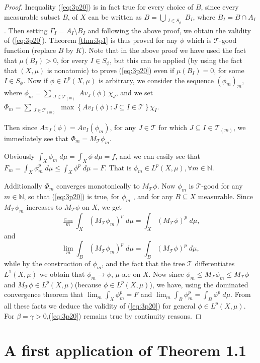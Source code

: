 \documentclass{article}
\numberwithin{equation}{section}
\theoremstyle{definition}
\theoremstyle{remark}
\newcommand{\mc}[1]{\mathcal{#1}}
\begin{document}
\begin{proof}
Inequality (\ref{eq:3p20}) is in fact true for every choice of $B$, since every measurable subset $B$, of $X$ can be written as  $B=\bigcup_{\substack{I\in S_\phi}}B_I$, where $B_I=B\cap A_I$. Then setting $\Gamma_I=A_I\setminus B_I$ and following the above proof, we obtain the validity of (\ref{eq:3p20}). Theorem \ref{thm:3p1} is thus proved for any $\phi$ which is $\mc T$-good function (replace $B$ by $K$). Note that in the above proof we have used the fact that $\mu(B_I)>0$, for every $I\in S_{\phi}$, but this can be applied (by using the fact that $(X, \mu)$ is nonatomic) to prove (\ref{eq:3p20}) even if $\mu(B_I)=0$, for some $I\in S_{\phi}$. Now if $\phi\in L^p(X,\mu)$ is arbitrary, we consider the sequence $(\phi_m)_m$, where $\phi_m=\sum_{\substack{J\in \mc T_{(m)}}} Av_J(\phi)\, \chi_J$, and we set $\Phi_m=\sum_{\substack{J\in \mc T_{(m)}}} \max \left\lbrace Av_I(\phi): J\subseteq I \in \mc T \right\rbrace \chi_I $.

Then since $Av_J(\phi)=Av_I(\phi_m)$, for any $J\in \mc T$ for which $J\subseteq I \in \mc T_{(m)}$, we immediately see that $\Phi_m= M_{\mc T}\phi_m$.

Obviously $\int_X \phi_m \; d\mu=\int_X \phi \; d\mu=f $, and we can easily see that $F_m=\int_X \phi_m^p\;d\mu \leq \int_X \phi^p \;d\mu=F$. That is $\phi_m\in L^p (X,\mu), \forall m\in \mathbb{N}$.

Additionally $\Phi_m$ converges monotonically to $M_{\mc T}\phi$. Now $\phi_m$ is $\mc T$-good for any $m\in \mathbb{N}$, so that (\ref{eq:3p20}) is true, for $\phi_m$ , and for any $B\subseteq X$ measurable. Since $M_{\mc T}\phi_m $ increases to $ M_{\mc T}\phi$ on $X$, we get
\[ \lim_m \int_X \left(M_{\mc T}\phi_m \right)^p\;d\mu = \int_X \left( M_{\mc T}\phi\right)^p \; d\mu, \] and
\[ \lim_m \int_B \left( M_{\mc T}\phi_m \right)^p\; d\mu =\int_B \left( M_{\mc T}\phi \right)^p\;d\mu, \] while by the construction of $\phi_m$, and the fact that the tree $\mc T$ differentiates $L^1(X,\mu)$ we obtain that $\phi_m\longrightarrow \phi$, $\mu$-a.e on $X$. Now since $\phi_m\leq M_{\mc T}\phi_m\leq M_{\mc T}\phi$ and $M_{\mc T}\phi\in L^p(X,\mu)$(because $\phi \in L^p(X,\mu)$), we have, using the dominated convergence theorem that $\lim_m \int_X \phi_m^p=F$ and $\lim_m \int_B \phi_m^p=\int_B \phi^p \; d\mu$. From all these facts we deduce the validity of (\ref{eq:3p20}) for general $\phi\in L^p(X,\mu)$. For $\beta=\gamma>0$,(\ref{eq:3p20}) remains true by continuity reasons.
\end{proof}
%
%
%
%
%
%
\section{A first application of Theorem 1.1} \label{sec:4}
\end{document}
